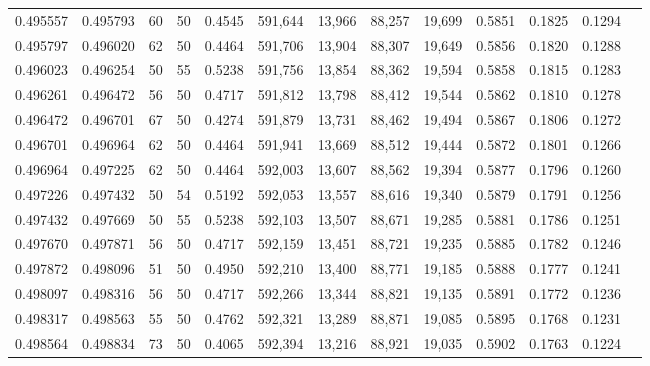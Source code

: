 \begin{tabular}{rrrrrrrrrrrrr}
0.495557 & 0.495793 &    60 &  50 &                                     0.4545 & 591,644 &  13,966 &  88,257 &  19,699 & 0.5851 & 0.1825 & 0.1294 \\
0.495797 & 0.496020 &    62 &  50 &                                     0.4464 & 591,706 &  13,904 &  88,307 &  19,649 & 0.5856 & 0.1820 & 0.1288 \\
0.496023 & 0.496254 &    50 &  55 &                                     0.5238 & 591,756 &  13,854 &  88,362 &  19,594 & 0.5858 & 0.1815 & 0.1283 \\
0.496261 & 0.496472 &    56 &  50 &                                     0.4717 & 591,812 &  13,798 &  88,412 &  19,544 & 0.5862 & 0.1810 & 0.1278 \\
0.496472 & 0.496701 &    67 &  50 &                                     0.4274 & 591,879 &  13,731 &  88,462 &  19,494 & 0.5867 & 0.1806 & 0.1272 \\
0.496701 & 0.496964 &    62 &  50 &                                     0.4464 & 591,941 &  13,669 &  88,512 &  19,444 & 0.5872 & 0.1801 & 0.1266 \\
0.496964 & 0.497225 &    62 &  50 &                                     0.4464 & 592,003 &  13,607 &  88,562 &  19,394 & 0.5877 & 0.1796 & 0.1260 \\
0.497226 & 0.497432 &    50 &  54 &                                     0.5192 & 592,053 &  13,557 &  88,616 &  19,340 & 0.5879 & 0.1791 & 0.1256 \\
0.497432 & 0.497669 &    50 &  55 &                                     0.5238 & 592,103 &  13,507 &  88,671 &  19,285 & 0.5881 & 0.1786 & 0.1251 \\
0.497670 & 0.497871 &    56 &  50 &                                     0.4717 & 592,159 &  13,451 &  88,721 &  19,235 & 0.5885 & 0.1782 & 0.1246 \\
0.497872 & 0.498096 &    51 &  50 &                                     0.4950 & 592,210 &  13,400 &  88,771 &  19,185 & 0.5888 & 0.1777 & 0.1241 \\
0.498097 & 0.498316 &    56 &  50 &                                     0.4717 & 592,266 &  13,344 &  88,821 &  19,135 & 0.5891 & 0.1772 & 0.1236 \\
0.498317 & 0.498563 &    55 &  50 &                                     0.4762 & 592,321 &  13,289 &  88,871 &  19,085 & 0.5895 & 0.1768 & 0.1231 \\
0.498564 & 0.498834 &    73 &  50 &                                     0.4065 & 592,394 &  13,216 &  88,921 &  19,035 & 0.5902 & 0.1763 & 0.1224 \\

\end{tabular}
